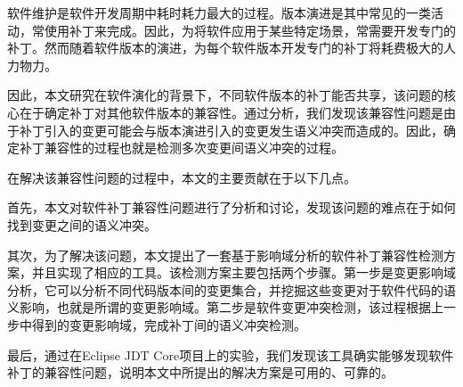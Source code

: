 

\begin{cabstract} 
	软件维护是软件开发周期中耗时耗力最大的过程。版本演进是其中常见的一类活动，常使用补丁来完成。因此，为将软件应用于某些特定场景，常需要开发专门的补丁。然而随着软件版本的演进，为每个软件版本开发专门的补丁将耗费极大的人力物力。
	
	因此，本文研究在软件演化的背景下，不同软件版本的补丁能否共享，该问题的核心在于确定补丁对其他软件版本的兼容性。通过分析，我们发现该兼容性问题是由于补丁引入的变更可能会与版本演进引入的变更发生语义冲突而造成的。因此，确定补丁兼容性的过程也就是检测多次变更间语义冲突的过程。
	
	在解决该兼容性问题的过程中，本文的主要贡献在于以下几点。
	
	首先，本文对软件补丁兼容性问题进行了分析和讨论，发现该问题的难点在于如何找到变更之间的语义冲突。
	
	其次，为了解决该问题，本文提出了一套基于影响域分析的软件补丁兼容性检测方案，并且实现了相应的工具。该检测方案主要包括两个步骤。第一步是变更影响域分析，它可以分析不同代码版本间的变更集合，并挖掘这些变更对于软件代码的语义影响，也就是所谓的变更影响域。第二步是软件变更冲突检测，该过程根据上一步中得到的变更影响域，完成补丁间的语义冲突检测。
	
	最后，通过在Eclipse JDT Core项目上的实验，我们发现该工具确实能够发现软件补丁的兼容性问题，说明本文中所提出的解决方案是可用的、可靠的。
\end{cabstract}


